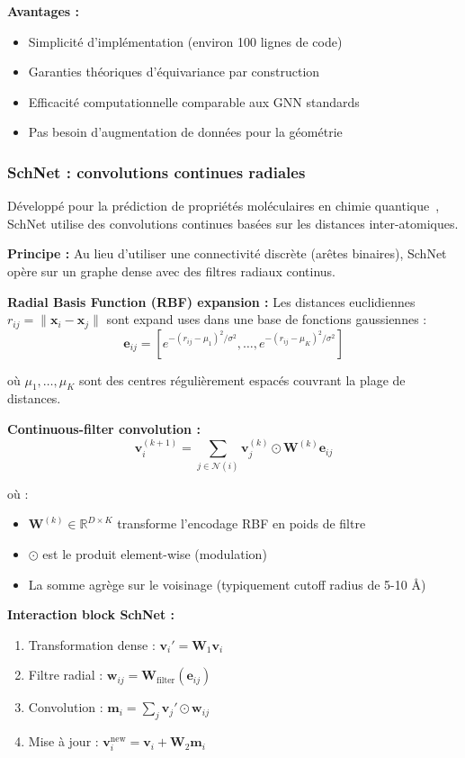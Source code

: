\textbf{Avantages :}
\begin{itemize}
    \item Simplicité d'implémentation (environ 100 lignes de code)
    \item Garanties théoriques d'équivariance par construction
    \item Efficacité computationnelle comparable aux GNN standards
    \item Pas besoin d'augmentation de données pour la géométrie
\end{itemize}

\subsubsection{SchNet : convolutions continues radiales}

Développé pour la prédiction de propriétés moléculaires en chimie quantique~\cite{Schutt2017,Schutt2018}, SchNet utilise des convolutions continues basées sur les distances inter-atomiques.

\textbf{Principe :}
Au lieu d'utiliser une connectivité discrète (arêtes binaires), SchNet opère sur un graphe dense avec des filtres radiaux continus.

\textbf{Radial Basis Function (RBF) expansion :}
Les distances euclidiennes $r_{ij} = \|\mathbf{x}_i - \mathbf{x}_j\|$ sont expand uses dans une base de fonctions gaussiennes :
\[
\mathbf{e}_{ij} = [e^{-(r_{ij} - \mu_1)^2/\sigma^2}, \ldots, e^{-(r_{ij} - \mu_K)^2/\sigma^2}]
\]

où $\mu_1, \ldots, \mu_K$ sont des centres régulièrement espacés couvrant la plage de distances.

\textbf{Continuous-filter convolution :}
\[
\mathbf{v}_i^{(k+1)} = \sum_{j \in \mathcal{N}(i)} \mathbf{v}_j^{(k)} \odot \mathbf{W}^{(k)} \mathbf{e}_{ij}
\]

où :
\begin{itemize}
    \item $\mathbf{W}^{(k)} \in \mathbb{R}^{D \times K}$ transforme l'encodage RBF en poids de filtre
    \item $\odot$ est le produit element-wise (modulation)
    \item La somme agrège sur le voisinage (typiquement cutoff radius de 5-10 Å)
\end{itemize}

\textbf{Interaction block SchNet :}
\begin{enumerate}
    \item Transformation dense : $\mathbf{v}_i' = \mathbf{W}_1 \mathbf{v}_i$
    \item Filtre radial : $\mathbf{w}_{ij} = \mathbf{W}_{\text{filter}}(\mathbf{e}_{ij})$
    \item Convolution : $\mathbf{m}_i = \sum_j \mathbf{v}_j' \odot \mathbf{w}_{ij}$
    \item Mise à jour : $\mathbf{v}_i^{\text{new}} = \mathbf{v}_i + \mathbf{W}_2 \mathbf{m}_i$
\end{enumerate}

